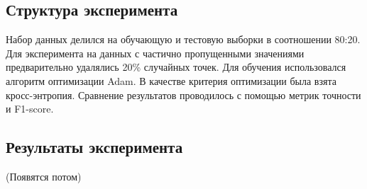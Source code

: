 \documentclass{article}
\begin{document}
\subsection{Структура эксперимента}

Набор данных делился на обучающую и тестовую выборки в соотношении 80:20. Для эксперимента на данных с частично пропущенными значениями предварительно удалялись 20\% случайных точек. Для обучения использовался алгоритм оптимизации Adam. В качестве критерия оптимизации была взята кросс-энтропия. Сравнение результатов проводилось с помощью метрик точности и F1-score. 

\subsection{Результаты эксперимента}

(Появятся потом)








\end{document}
